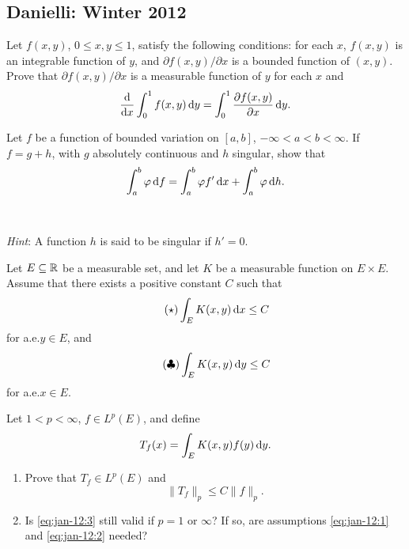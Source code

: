 \setcounter{exercise}{0}
\setcounter{equation}{0}
\subsection{Danielli: Winter 2012}
\begin{problem}
  Let \(f(x,y)\), \(0\leq x,y\leq 1\), satisfy the following conditions:
  for each \(x\), \(f(x,y)\) is an integrable function of \(y\), and
  \(\partial f(x,y)/\partial x\) is a bounded function of \((x,y)\). Prove
  that \(\partial f(x,y)/\partial x\) is a measurable function of \(y\) for
  each \(x\) and
  \[
    \frac{\mathrm{d}}{\mathrm{d} x}\int_0^1f(x,y)\mathop{}\!\mathrm{d} y= \int_0^1\frac{\partial
      f(x,y)}{\partial x}\mathop{}\!\mathrm{d} y.
  \]
\end{problem}
\begin{solution}
\end{solution}

\begin{problem}
  Let \(f\) be a function of bounded variation on \([a,b]\),
  \(-\infty<a<b<\infty\). If \(f=g+h\), with \(g\) absolutely continuous
  and \(h\) singular, show that
  \[
    \int_a^b\varphi\mathop{}\!\mathrm{d} f=\int_a^b\varphi f'\mathop{}\!\mathrm{d} x+\int_a^b\varphi\mathop{}\!\mathrm{d}
    h.
  \]
  \\\\
  \emph{Hint}: A function \(h\) is said to be singular if \(h'=0\).
\end{problem}
\begin{solution}
\end{solution}

\begin{problem}
  Let \(E\subseteq\mathbb{R}\) be a measurable set, and let \(K\) be a measurable
  function on \(E\times E\). Assume that there exists a positive constant
  \(C\) such that
  \[
    \label{eq:jan-12:1}
    \tag{\(\bigstar\)}
    \int_E K(x,y)\diff x\leq C
  \]
  for a.e.\@ \(y\in E\), and
  \[
    \label{eq:jan-12:2}
    \tag{\(\clubsuit\)}
    \int_E K(x,y)\mathop{}\!\mathrm{d} y\leq C
  \]
  for a.e.\@ \(x\in E\).

  Let \(1<p<\infty\), \(f\in L^p(E)\), and define
  \[
    T_f(x)=\int_E K(x,y)f(y)\mathop{}\!\mathrm{d} y.
  \]
  \begin{enumerate}[label=(\alph*),noitemsep]
  \item Prove that \(T_f\in L^p(E)\) and
    \[
      \label{eq:jan-12:3}
      \tag{\(\spadesuit\)}
      \|T_f\|_p\leq C\|f\|_p.
    \]
  \item Is \eqref{eq:jan-12:3} still valid if \(p=1\) or \(\infty\)? If so,
    are assumptions \eqref{eq:jan-12:1} and \eqref{eq:jan-12:2} needed?
  \end{enumerate}
\end{problem}
\begin{solution}
\end{solution}

